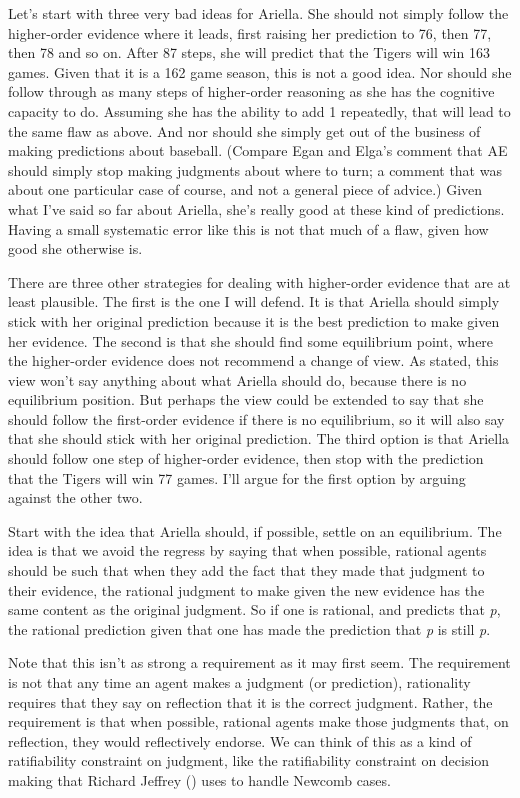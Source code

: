 \documentclass[
  10pt,
  letterpaper,
  twoside]{scrbook}
\begin{document}
Let's start with three very bad ideas for {Ariella}. She should not
simply follow the higher-order evidence where it leads, first raising
her prediction to 76, then 77, then 78 and so on. After 87 steps, she
will predict that the Tigers will win 163 games. Given that it is a 162
game season, this is not a good idea. Nor should she follow through as
many steps of higher-order reasoning as she has the cognitive capacity
to do. Assuming she has the ability to add 1 repeatedly, that will lead
to the same flaw as above. And nor should she simply get out of the
business of making predictions about baseball. (Compare Egan and Elga's
comment that AE should simply stop making judgments about where to turn;
a comment that was about one particular case of course, and not a
general piece of advice.) Given what I've said so far about {Ariella},
she's really good at these kind of predictions. Having a small
systematic error like this is not that much of a flaw, given how good
she otherwise is.

There are three other strategies for dealing with higher-order evidence
that are at least plausible. The first is the one I will defend. It is
that {Ariella} should simply stick with her original prediction because
it is the best prediction to make given her evidence. The second is that
she should find some equilibrium point, where the higher-order evidence
does not recommend a change of view. As stated, this view won't say
anything about what {Ariella} should do, because there is no equilibrium
position. But perhaps the view could be extended to say that she should
follow the first-order evidence if there is no equilibrium, so it will
also say that she should stick with her original prediction. The third
option is that {Ariella} should follow one step of higher-order
evidence, then stop with the prediction that the Tigers will win 77
games. I'll argue for the first option by arguing against the other two.

Start with the idea that {Ariella} should, if possible, settle on an
equilibrium. The idea is that we avoid the regress by saying that when
possible, rational agents should be such that when they add the fact
that they made that judgment to their evidence, the rational judgment to
make given the new evidence has the same content as the original
judgment. So if one is rational, and predicts that \emph{p}, the
rational prediction given that one has made the prediction that \emph{p}
is still \emph{p}.

Note that this isn't as strong a requirement as it may first seem. The
requirement is not that any time an agent makes a judgment (or
prediction), rationality requires that they say on reflection that it is
the correct judgment. Rather, the requirement is that when possible,
rational agents make those judgments that, on reflection, they would
reflectively endorse. We can think of this as a kind of ratifiability
constraint on judgment, like the ratifiability constraint on decision
making that Richard Jeffrey () uses to
handle Newcomb cases.
\end{document}

